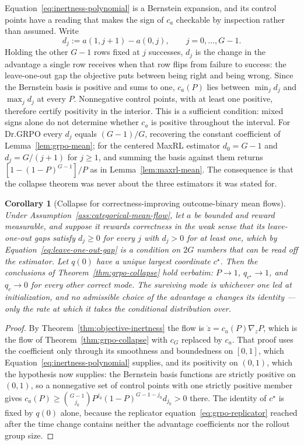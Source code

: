 \documentclass{article}
\newcommand{\enforcehalffinalproseline}{%
  \setlength{\parfillskip}{0pt plus .20\linewidth}}
\newcommand{\1}{\mathbf 1}
\newtheorem{corollary}[lemma]{Corollary}
\theoremstyle{remark}
\theoremstyle{definition}
\theoremstyle{plain}
\begin{document}
Equation~\eqref{eq:inertness-polynomial} is a Bernstein expansion, and its
control points have a reading that makes the sign of $c_a$ checkable by
inspection rather than assumed. Write
\begin{equation}
 d_j:=a(1,j+1)-a(0,j),\qquad j=0,\ldots,G-1 .
 \label{eq:leave-one-out-gap}
\end{equation}
Holding the other $G-1$ rows fixed at $j$ successes, $d_j$ is the change in the
advantage a single row receives when that row flips from failure to success:
the leave-one-out gap the objective puts between being right and being wrong.
Since the Bernstein basis is positive and sums to one, $c_a(P)$ lies between
$\min_jd_j$ and $\max_jd_j$ at every $P$. Nonnegative control points,
with at least one positive, therefore certify positivity in the interior.
This is a sufficient condition: mixed signs alone do not determine whether
$c_a$ is positive throughout the interval.
For Dr.GRPO every $d_j$ equals $(G-1)/G$, recovering the constant coefficient
of Lemma~\ref{lem:grpo-mean}; for the centered MaxRL estimator $d_0=G-1$ and
$d_j=G/(j+1)$ for $j\ge1$, and summing the basis against them returns
$[1-(1-P)^{G-1}]/P$ as in Lemma~\ref{lem:maxrl-mean}. The consequence is that
the collapse theorem was never about the three estimators it was stated for.

\begin{corollary}[Collapse for correctness-improving outcome-binary mean flows]
\enforcehalffinalproseline
\label{cor:class-collapse}
Under Assumption~\ref{ass:categorical-mean-flow}, let $a$ be bounded and
reward measurable, and suppose it rewards correctness in the weak sense that
its leave-one-out gaps satisfy $d_j\ge0$ for every $j$ with $d_j>0$ for at
least one, which by Equation~\eqref{eq:leave-one-out-gap} is a condition on
$2G$ numbers that can be read off the estimator. Let $q(0)$ have a unique
largest coordinate $c^\star$. Then the conclusions of Theorem~\ref{thm:grpo-collapse}
hold verbatim: $P\to1$, $q_{c^\star}\to1$, and $q_c\to0$ for every other
correct mode. The surviving mode is whichever one led at initialization, and
no admissible choice of the advantage $a$ changes its identity --- only the
rate at which it takes the conditional distribution over.
\end{corollary}

\begin{proof}
\enforcehalffinalproseline
By Theorem~\ref{thm:objective-inertness} the flow is
$\dot z=c_a(P)\nabla_zP$, which is the flow of
Theorem~\ref{thm:grpo-collapse} with $c_G$ replaced by $c_a$. That proof uses
the coefficient only through its smoothness and boundedness on $[0,1]$, which
Equation~\eqref{eq:inertness-polynomial} supplies, and its positivity on
$(0,1)$, which the hypothesis now supplies: the Bernstein basis functions are
strictly positive on $(0,1)$, so a nonnegative set of control points with one
strictly positive member gives $c_a(P)\ge\binom{G-1}{j_0}P^{j_0}(1-P)^{G-1-j_0}
d_{j_0}>0$ there. The identity of $c^\star$ is fixed by $q(0)$ alone, because
the replicator equation~\eqref{eq:grpo-replicator} reached after the time
change contains neither the advantage coefficients nor the rollout group size.
\end{proof}
\end{document}
